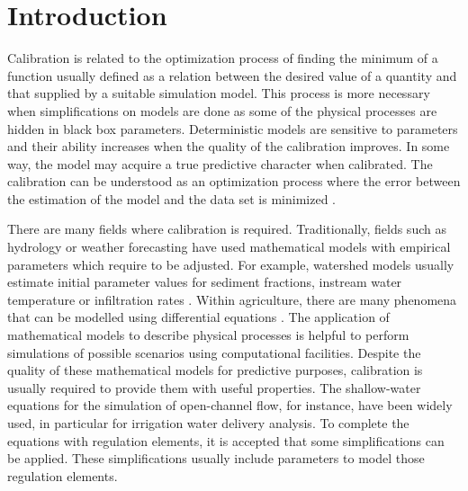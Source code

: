 \documentclass[review,authoryear]{elsarticle}
\begin{document}
\maketitle

\section{Introduction}

Calibration is related to the optimization process of finding the minimum of a
function usually defined as a relation between the desired value of a quantity
and that supplied by a suitable simulation model. This process is more necessary
when simplifications on models are done as some of the
physical processes are hidden in black box parameters. Deterministic models are
sensitive to parameters and their ability increases when the quality of the
calibration improves. In some way, the model may acquire a true predictive
character when calibrated. The calibration can be understood as an optimization
process where the error between the estimation of the model and the data set is
minimized \citep{Lacasta16}.

There are many fields where calibration is required. Traditionally, fields such
as hydrology or weather forecasting have used mathematical models with empirical
parameters which require to be adjusted. For example, watershed models usually
estimate initial parameter values for sediment fractions, instream water
temperature or infiltration rates \citep{Duan04}. Within agriculture, there are
many phenomena that can be modelled using differential equations
\citep{Playan06,JaviSurcos2,Ebrahimiam13,Ouazaa14,Ouazaa15,SedagatdoostEbraimian15}.
The application of
mathematical models to describe physical processes is helpful to perform
simulations of possible scenarios using computational facilities. Despite the
quality of these mathematical models for predictive purposes, calibration is
usually required to provide them with useful properties. The
shallow-water equations for the simulation of open-channel flow, for instance,
have been widely used, in particular for irrigation water delivery analysis. To
complete the equations with regulation elements, it is accepted that some
simplifications can be applied. These simplifications usually include parameters
to model those regulation elements.
\end{document}
